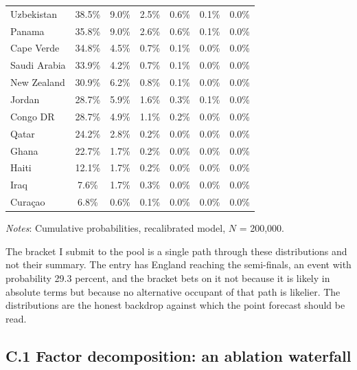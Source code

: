 \documentclass[11pt,letterpaper]{article}
\begin{document}
\begin{table}[p]
\begin{footnotesize}
\begin{threeparttable}
{\begin{tabular*}{\textwidth}{@{\extracolsep{\fill}} lcccccc}
Uzbekistan             & 38.5\% &  9.0\% &  2.5\% &  0.6\% &  0.1\% &  0.0\% \\
Panama                 & 35.8\% &  9.0\% &  2.6\% &  0.6\% &  0.1\% &  0.0\% \\
Cape Verde             & 34.8\% &  4.5\% &  0.7\% &  0.1\% &  0.0\% &  0.0\% \\
Saudi Arabia           & 33.9\% &  4.2\% &  0.7\% &  0.1\% &  0.0\% &  0.0\% \\
New Zealand            & 30.9\% &  6.2\% &  0.8\% &  0.1\% &  0.0\% &  0.0\% \\
Jordan                 & 28.7\% &  5.9\% &  1.6\% &  0.3\% &  0.1\% &  0.0\% \\
Congo DR               & 28.7\% &  4.9\% &  1.1\% &  0.2\% &  0.0\% &  0.0\% \\
Qatar                  & 24.2\% &  2.8\% &  0.2\% &  0.0\% &  0.0\% &  0.0\% \\
Ghana                  & 22.7\% &  1.7\% &  0.2\% &  0.0\% &  0.0\% &  0.0\% \\
Haiti                  & 12.1\% &  1.7\% &  0.2\% &  0.0\% &  0.0\% &  0.0\% \\
Iraq                   &  7.6\% &  1.7\% &  0.3\% &  0.0\% &  0.0\% &  0.0\% \\
Curaçao                &  6.8\% &  0.6\% &  0.1\% &  0.0\% &  0.0\% &  0.0\% \\
      \bottomrule
    \end{tabular*}}
    \begin{tablenotes}\notesize
      \item \textit{Notes}: Cumulative probabilities, recalibrated model, $N$ = 200{,}000.
    \end{tablenotes}
  \end{threeparttable}
  \end{footnotesize}
\end{table}

The bracket I submit to the pool is a single path through these distributions and not their summary. The entry has England reaching the semi-finals, an event with probability 29.3 percent, and the bracket bets on it not because it is likely in absolute terms but because no alternative occupant of that path is likelier. The distributions are the honest backdrop against which the point forecast should be read.

\subsection*{C.1 \quad Factor decomposition: an ablation waterfall}
\end{document}
